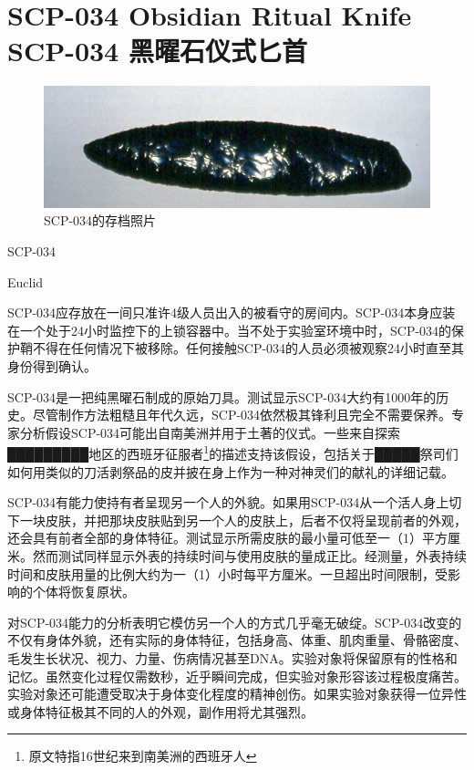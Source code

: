 \chapter[SCP-034 黑曜石仪式匕首]{
    SCP-034 Obsidian Ritual Knife\\
    SCP-034 黑曜石仪式匕首
}

\label{chap:SCP-034}

\begin{figure}[H]
    \centering
    \includegraphics[width=0.5\linewidth]{images/SCP.034.jpg}
    \caption*{SCP-034的存档照片}
\end{figure}

SCP-034

Euclid

SCP-034应存放在一间只准许4级人员出入的被看守的房间内。SCP-034本身应装在一个处于24小时监控下的上锁容器中。当不处于实验室环境中时，SCP-034的保护鞘不得在任何情况下被移除。任何接触SCP-034的人员必须被观察24小时直至其身份得到确认。

SCP-034是一把纯黑曜石制成的原始刀具。测试显示SCP-034大约有1000年的历史。尽管制作方法粗糙且年代久远，SCP-034依然极其锋利且完全不需要保养。专家分析假设SCP-034可能出自南美洲并用于土著的仪式。一些来自探索█████████地区的西班牙征服者\footnote{原文特指16世纪来到南美洲的西班牙人}的描述支持该假设，包括关于█████祭司们如何用类似的刀活剥祭品的皮并披在身上作为一种对神灵们的献礼的详细记载。

SCP-034有能力使持有者呈现另一个人的外貌。如果用SCP-034从一个活人身上切下一块皮肤，并把那块皮肤贴到另一个人的皮肤上，后者不仅将呈现前者的外观，还会具有前者全部的身体特征。测试显示所需皮肤的最小量可低至一（1）平方厘米。然而测试同样显示外表的持续时间与使用皮肤的量成正比。经测量，外表持续时间和皮肤用量的比例大约为一（1）小时每平方厘米。一旦超出时间限制，受影响的个体将恢复原状。

对SCP-034能力的分析表明它模仿另一个人的方式几乎毫无破绽。SCP-034改变的不仅有身体外貌，还有实际的身体特征，包括身高、体重、肌肉重量、骨骼密度、毛发生长状况、视力、力量、伤病情况甚至DNA。实验对象将保留原有的性格和记忆。虽然变化过程仅需数秒，近乎瞬间完成，但实验对象形容该过程极度痛苦。实验对象还可能遭受取决于身体变化程度的精神创伤。如果实验对象获得一位异性或身体特征极其不同的人的外观，副作用将尤其强烈。

